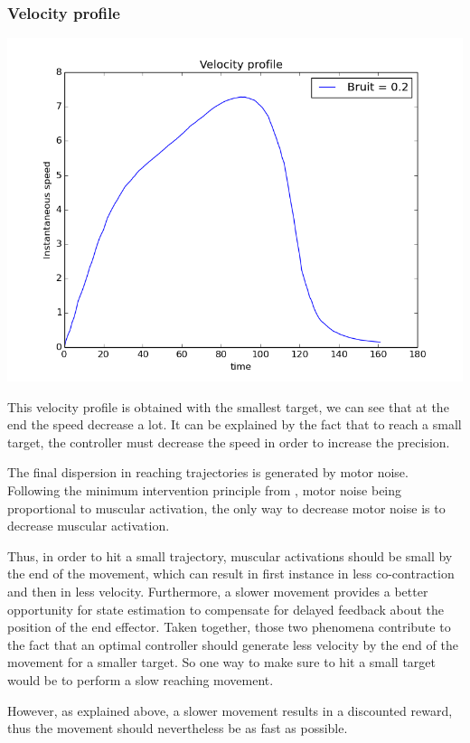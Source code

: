 \documentclass[pdftex,a4paper,11pt]{report}
\begin{document}
\subsubsection{Velocity profile}
\begin{center}
\includegraphics[scale=0.5]{figures/velocityProfileTreachSize0p02.png}
\end{center}
This velocity profile is obtained with the smallest target, we can see that at the end the speed decrease a lot. It can be explained by the fact that to reach a small target, the controller must decrease the speed in order to increase the precision.

The final dispersion in reaching trajectories is generated by motor noise.
Following the minimum intervention principle from \cite{todorov02_NN}, motor noise being proportional to muscular activation, the only way to decrease motor noise is to decrease muscular activation.

Thus, in order to hit a small trajectory, muscular activations should be small
by the end of the movement, which can result in first instance in less co-contraction and then in less velocity. Furthermore, a slower movement provides a better opportunity for state estimation to compensate for delayed feedback about the position of the end effector. Taken together, those two phenomena contribute to the fact that an optimal controller should generate less velocity by the end of the movement for a smaller target.
So one way to make sure to hit a small target would be to perform a slow reaching movement.

However, as explained above, a slower movement results in a discounted reward,
thus the movement should nevertheless be as fast as possible.
\end{document}
